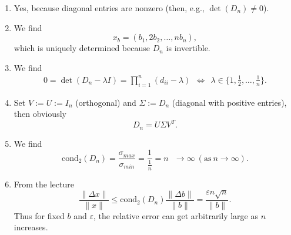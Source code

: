 {\color{solution}
\begin{enumerate}
	\item Yes, because diagonal entries are nonzero (then, e.g., $\det(D_n) \neq 0$).
	\item We find
			$$x_b = (b_1, 2b_2,\ldots,nb_n),$$
			which is uniquely determined because $D_n$ is invertible.
	\item We find
		\begin{align*}
		0 = \det(D_n - \lambda I) = \prod_{i=1}^{n} (d_{ii} - \lambda) ~~\Leftrightarrow~~\lambda \in \{1,\frac{1}{2},\ldots,\frac{1}{n}\}.
		\end{align*}
	\item Set $V:=U:= I_n$ (orthogonal) and $\Sigma := D_n$ (diagonal with positive entries), then obviously $$D_n = U\Sigma V^T. $$
	\item We find
	$$\text{cond}_2(D_n) = \frac{\sigma_{max}}{\sigma_{min}}= \frac{1}{\frac{1}{n}}= n ~~~\to \infty~(\text{as}~n \to \infty). $$
	\item From the lecture 
	$$\frac{\|\Delta x\|}{\|x\|} \leq \text{cond}_2(D_n)\frac{\|\Delta b\|}{\|b\|} = \frac{ \varepsilon n\sqrt{n}}{\|b\|} .$$
	Thus for fixed $b$ and $\varepsilon$, the relative error can get arbitrarily large as $n$ increases.
\end{enumerate}
}
